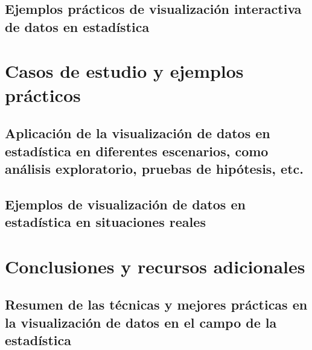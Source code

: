 \documentclass[
  a4paper,
]{article}
\begin{document}
\hypertarget{ejemplos-pruxe1cticos-de-visualizaciuxf3n-interactiva-de-datos-en-estaduxedstica}{%
\subsection{Ejemplos prácticos de visualización interactiva de datos en
estadística}\label{ejemplos-pruxe1cticos-de-visualizaciuxf3n-interactiva-de-datos-en-estaduxedstica}}

\hypertarget{casos-de-estudio-y-ejemplos-pruxe1cticos}{%
\section{Casos de estudio y ejemplos
prácticos}\label{casos-de-estudio-y-ejemplos-pruxe1cticos}}

\hypertarget{aplicaciuxf3n-de-la-visualizaciuxf3n-de-datos-en-estaduxedstica-en-diferentes-escenarios-como-anuxe1lisis-exploratorio-pruebas-de-hipuxf3tesis-etc.}{%
\subsection{Aplicación de la visualización de datos en estadística en
diferentes escenarios, como análisis exploratorio, pruebas de hipótesis,
etc.}\label{aplicaciuxf3n-de-la-visualizaciuxf3n-de-datos-en-estaduxedstica-en-diferentes-escenarios-como-anuxe1lisis-exploratorio-pruebas-de-hipuxf3tesis-etc.}}

\hypertarget{ejemplos-de-visualizaciuxf3n-de-datos-en-estaduxedstica-en-situaciones-reales}{%
\subsection{Ejemplos de visualización de datos en estadística en
situaciones
reales}\label{ejemplos-de-visualizaciuxf3n-de-datos-en-estaduxedstica-en-situaciones-reales}}

\hypertarget{conclusiones-y-recursos-adicionales}{%
\section{Conclusiones y recursos
adicionales}\label{conclusiones-y-recursos-adicionales}}

\hypertarget{resumen-de-las-tuxe9cnicas-y-mejores-pruxe1cticas-en-la-visualizaciuxf3n-de-datos-en-el-campo-de-la-estaduxedstica}{%
\subsection{Resumen de las técnicas y mejores prácticas en la
visualización de datos en el campo de la
estadística}\label{resumen-de-las-tuxe9cnicas-y-mejores-pruxe1cticas-en-la-visualizaciuxf3n-de-datos-en-el-campo-de-la-estaduxedstica}}
\end{document}
